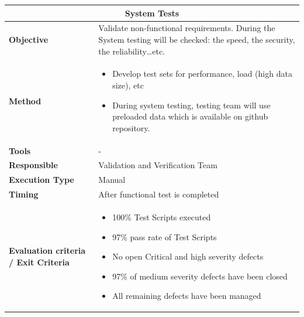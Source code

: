 \begin{center}
\begin{longtable}[H]{|p{4cm}|p{9cm}|}\hline
\multicolumn{2}{|c|}{\textbf{System Tests}}\\\hline
\textbf{Objective} &  Validate non-functional requirements. During the System testing will be checked: the speed, the security, the reliability…etc.\\\hline
\textbf{Method} & \begin{itemize}
\item Develop test sets for performance, load (high data size), etc
\item During system testing, testing team will use preloaded data which is available on github repository.
\end{itemize}  \\\hline
\textbf{Tools} & -\\\hline
\textbf{Responsible} & Validation and Verification Team\\\hline
\textbf{Execution Type} & Manual\\\hline
\textbf{Timing} &  After functional test is completed\\\hline
\textbf{Evaluation criteria / Exit Criteria} & \begin{itemize}
\item 100\% Test Scripts executed
\item 97\% pass rate of Test Scripts
\item No open Critical and high severity defects
\item 97\% of medium severity defects have been closed 
\item All remaining defects have been managed
\end{itemize} \\\hline
\end{longtable}
\end{center}

